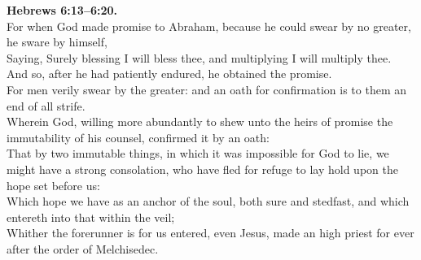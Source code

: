 \documentclass[10pt]{article} %
\begin{document}
{\begin{minipage}[t]{0.45\textwidth}
\textbf{Hebrews 6:13--6:20.}\\
For when God made promise to Abraham, because he could swear by no greater, he sware by himself,\\
Saying, Surely blessing I will bless thee, and multiplying I will multiply thee.\\
And so, after he had patiently endured, he obtained the promise.\\
For men verily swear by the greater: and an oath for confirmation is to them an end of all strife.\\
Wherein God, willing more abundantly to shew unto the heirs of promise the immutability of his counsel, confirmed it by an oath:\\
That by two immutable things, in which it was impossible for God to lie, we might have a strong consolation, who have fled for refuge to lay hold upon the hope set before us:\\
Which hope we have as an anchor of the soul, both sure and stedfast, and which entereth into that within the veil;\\
Whither the forerunner is for us entered, even Jesus, made an high priest for ever after the order of Melchisedec.\\

\end{minipage}}
\vspace*{\fill}
\newpage
\Huge%
\vspace*{\fill}
\begin{spacing}{1.0}%
\end{spacing}
\vspace*{\fill}
\end{document}
